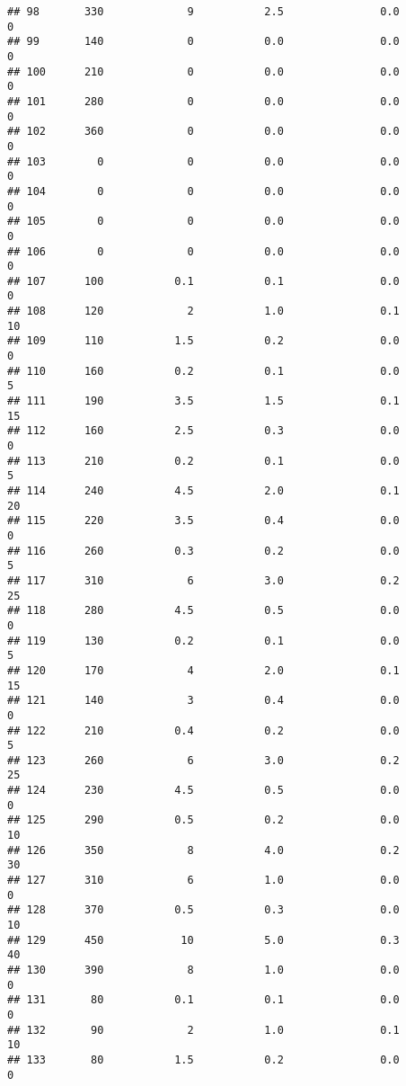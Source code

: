 \documentclass[
]{article}
\begin{document}
\begin{verbatim}
## 98       330             9           2.5               0.0           0
## 99       140             0           0.0               0.0           0
## 100      210             0           0.0               0.0           0
## 101      280             0           0.0               0.0           0
## 102      360             0           0.0               0.0           0
## 103        0             0           0.0               0.0           0
## 104        0             0           0.0               0.0           0
## 105        0             0           0.0               0.0           0
## 106        0             0           0.0               0.0           0
## 107      100           0.1           0.1               0.0           0
## 108      120             2           1.0               0.1          10
## 109      110           1.5           0.2               0.0           0
## 110      160           0.2           0.1               0.0           5
## 111      190           3.5           1.5               0.1          15
## 112      160           2.5           0.3               0.0           0
## 113      210           0.2           0.1               0.0           5
## 114      240           4.5           2.0               0.1          20
## 115      220           3.5           0.4               0.0           0
## 116      260           0.3           0.2               0.0           5
## 117      310             6           3.0               0.2          25
## 118      280           4.5           0.5               0.0           0
## 119      130           0.2           0.1               0.0           5
## 120      170             4           2.0               0.1          15
## 121      140             3           0.4               0.0           0
## 122      210           0.4           0.2               0.0           5
## 123      260             6           3.0               0.2          25
## 124      230           4.5           0.5               0.0           0
## 125      290           0.5           0.2               0.0          10
## 126      350             8           4.0               0.2          30
## 127      310             6           1.0               0.0           0
## 128      370           0.5           0.3               0.0          10
## 129      450            10           5.0               0.3          40
## 130      390             8           1.0               0.0           0
## 131       80           0.1           0.1               0.0           0
## 132       90             2           1.0               0.1          10
## 133       80           1.5           0.2               0.0           0

\end{verbatim}
\end{document}
